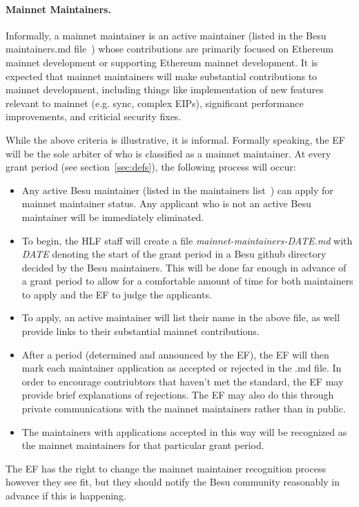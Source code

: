 \paragraph{Mainnet Maintainers.} Informally, a mainnet maintainer is an active maintainer (listed in the Besu maintainers.md file~\cite{BesuM}) whose contributions are primarily focused on Ethereum mainnet development or supporting Ethereum mainnet development.  It is expected that mainnet maintainers will make substantial contributions to mainnet development, including things like implementation of new features relevant to mainnet (e.g. sync, complex EIPs), significant performance improvements, and criticial security fixes.

While the above criteria is illustrative, it is informal.  Formally speaking, the EF will be the sole arbiter of who is classified as a mainnet maintainer.  At every grant period (see section~\ref{sec:defs}), the following process will occur:
\begin{itemize}
\item Any active Besu maintainer (listed in the maintainers list~\cite{BesuM}) can apply for mainnet maintainer status.  Any applicant who is not an active Besu maintainer will be immediately eliminated.
\item To begin, the HLF staff will create a file \emph{mainnet-maintainers-DATE.md} with \emph{DATE} denoting the start of the grant period in a Besu github directory decided by the Besu maintainers.  This will be done far enough in advance of a grant period to allow for a comfortable amount of time for both maintainers to apply and the EF to judge the applicants.
\item To apply, an active maintainer will list their name in the above file, as well provide links to their substantial mainnet contributions.
\item After a period (determined and announced by the EF), the EF will then mark each maintainer application as accepted or rejected in the .md file.  In order to encourage contriubtors that haven't met the standard, the EF may provide brief explanations of rejections.  The EF may also do this through private communications with the mainnet maintainers rather than in public.
\item The maintainers with applications accepted in this way will be recognized as the mainnet maintainers for that particular grant period.
\end{itemize}

The EF has the right to change the mainnet maintainer recognition process however they see fit, but they should notify the Besu community reasonably in advance if this is happening.


